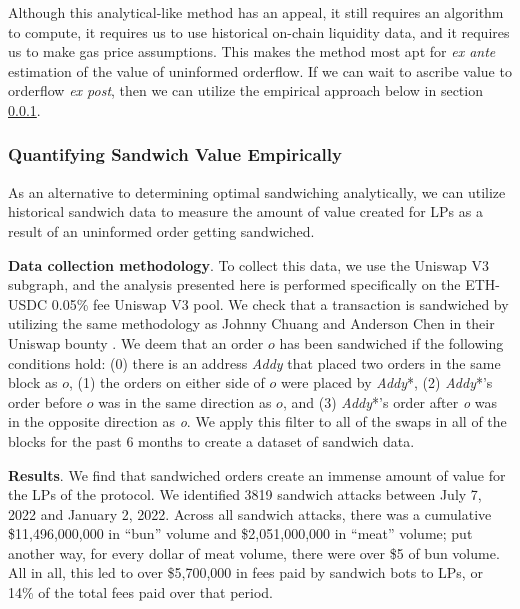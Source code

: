 
        Although this analytical-like method has an appeal, it still requires an algorithm to compute, it requires us to use historical on-chain liquidity data, and it requires us to make gas price assumptions. This makes the method most apt for \textit{ex ante} estimation of the value of uninformed orderflow. If we can wait to ascribe value to orderflow \textit{ex post}, then we can utilize the empirical approach below in section \ref{section:sandwich-value-empirical}.

    
    \subsubsection{Quantifying Sandwich Value Empirically} \label{section:sandwich-value-empirical}
    
        As an alternative to determining optimal sandwiching analytically, we can utilize historical sandwich data to measure the amount of value created for LPs as a result of an uninformed order getting sandwiched.

        \textbf{Data collection methodology}. 
        To collect this data, we use the Uniswap V3 subgraph, and the analysis presented here is performed specifically on the ETH-USDC 0.05\% fee Uniswap V3 pool. We check that a transaction is sandwiched by utilizing the same methodology as Johnny Chuang and Anderson Chen in their Uniswap bounty 
        \cite{chuang2022mev}. 
        We deem that an order $o$ has been sandwiched if the following conditions hold: (0) there is an address \textit{Addy} that placed two orders in the same block as $o$, (1) the orders on either side of $o$ were placed by \textit{Addy}*, (2) \textit{Addy}*'s order before $o$ was in the same direction as $o$, and (3) \textit{Addy}*'s order after \textit{o} was in the opposite direction as \textit{o}. We apply this filter to all of the swaps in all of the blocks for the past 6 months to create a dataset of sandwich data.

        \textbf{Results}.
        We find that sandwiched orders create an immense amount of value for the LPs of the protocol. We identified 3819 sandwich attacks between July 7, 2022 and January 2, 2022. Across all sandwich attacks, there was a cumulative \$11,496,000,000 in ``bun'' volume and \$2,051,000,000 in ``meat'' volume; put another way, for every dollar of meat volume, there were over \$5 of bun volume. All in all, this led to over \$5,700,000 in fees paid by sandwich bots to LPs, or 14\% of the total fees paid over that period.

